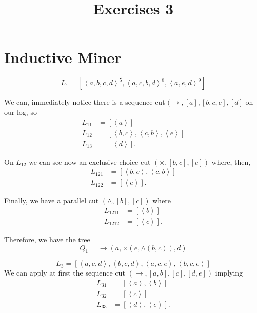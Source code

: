 \documentclass[a4paper]{report}
\title{Exercises 3}
\begin{document}
\maketitle

\section*{Inductive Miner}


\[
L_1 = \left[ \left< a,b,c,d\right>^{5}, \left<a,c,b,d \right>^{8}, \left<a,e,d \right>^{9} \right] 
\] 

We can, immediately notice there is a sequence cut $(\to ,\left[ a \right] , \left[ b,c,e \right]
, \left[ d \right] $ on our log, so 
\begin{equation}
    \begin{split}
	L_{11}&= \left[ \left<a \right> \right]  \\
	L_{12}&= \left[ \left<b,c \right>, \left<c,b \right>, \left< e\right> \right] \\
	L_{13}&= \left[ \left<d \right> \right] .
    \end{split}
\end{equation}

On $L_{12}$ we can see now an exclusive choice cut $\left( \times , \left[ b,c \right] ,\left[
e\right] \right) $ where, then,
\begin{equation}
    \begin{split}
	L_{121}&= \left[ \left<b,c \right>,\left<c,b \right> \right] \\
	L_{122}&= \left[ \left<e \right> \right] .
    \end{split}
\end{equation}

Finally, we have a parallel cut $(\wedge, \left[ b \right] , \left[ c \right] )$ where
\begin{equation}
\begin{split}
    L_{1211}&= \left[ \left<b \right> \right] \\
    L_{1212}&= \left[ \left<c \right> \right] .
\end{split}
\end{equation}

Therefore, we have the tree \[
    Q_1= \to (a, \times (e, \wedge(b,c)), d)
\] 


\[
L_3=\left[ \left<a,c,d \right>, \left<b,c,d \right>, \left< a,c,e\right>, \left<b,c,e \right> \right] 
\] 
We can apply at first the sequence cut $(\to , [a,b], [c], [d,e])$ implying
\begin{equation}
    \begin{split}
	L_{31}&= \left[ \left<a \right>, \left<b \right> \right] \\
	L_{32}&=\left[ \left<c \right> \right] \\
	L_{33}&=\left[ \left<d \right>,\left<e \right> \right] .
    \end{split}
\end{equation}
\end{document}
